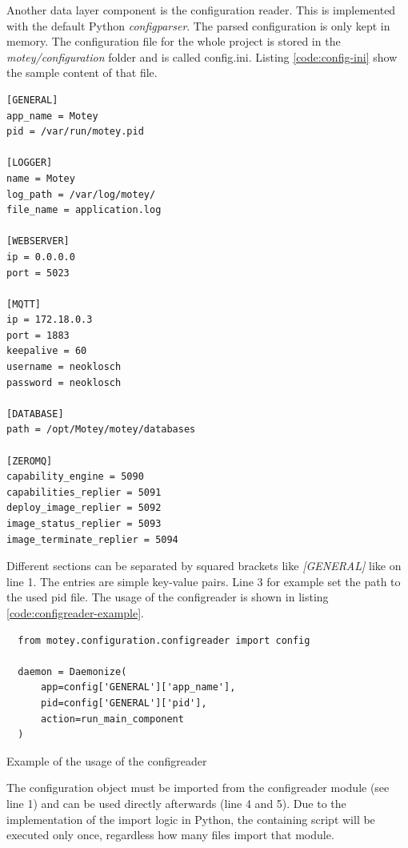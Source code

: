 Another data layer component is the configuration reader.
This is implemented with the default Python \textit{configparser}.
The parsed configuration is only kept in memory.
The configuration file for the whole project is stored in the \textit{motey/configuration} folder and is called config.ini.
Listing \ref{code:config-ini} show the sample content of that file.
\begin{verbatim}
[GENERAL]
app_name = Motey
pid = /var/run/motey.pid

[LOGGER]
name = Motey
log_path = /var/log/motey/
file_name = application.log

[WEBSERVER]
ip = 0.0.0.0
port = 5023

[MQTT]
ip = 172.18.0.3
port = 1883
keepalive = 60
username = neoklosch
password = neoklosch

[DATABASE]
path = /opt/Motey/motey/databases

[ZEROMQ]
capability_engine = 5090
capabilities_replier = 5091
deploy_image_replier = 5092
image_status_replier = 5093
image_terminate_replier = 5094
\end{verbatim}
\vspace{0.5cm}
Different sections can be separated by squared brackets like \textit{[GENERAL]} like on line 1.
The entries are simple key-value pairs.
Line 3 for example set the path to the used pid file.
The usage of the configreader is shown in listing \ref{code:configreader-example}.

\begin{listing}[H]
  \begin{verbatim}
  from motey.configuration.configreader import config

  daemon = Daemonize(
      app=config['GENERAL']['app_name'],
      pid=config['GENERAL']['pid'],
      action=run_main_component
  )
  \end{verbatim}
  \caption{Example of the usage of the configreader}
  \label{code:configreader-example}
\end{listing}
The configuration object must be imported from the configreader module (see line 1) and can be used directly afterwards (line 4 and 5).
Due to the implementation of the import logic in Python, the containing script will be executed only once, regardless how many files import that module.


